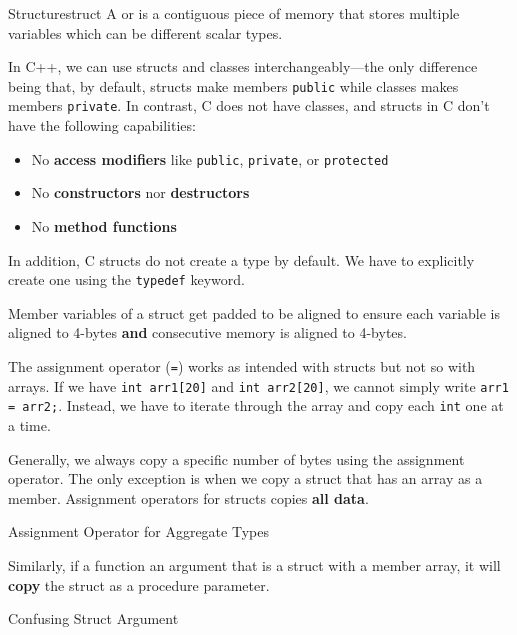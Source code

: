 \documentclass[12pt]{report}
\begin{document}
\begin{dfnbox}{Structure}{struct}
    A  or  is a contiguous piece of memory that stores multiple variables which can be different scalar types.
\end{dfnbox}

In C++, we can use structs and classes interchangeably---the only difference being that, by default, structs make members \texttt{public} while classes makes members \texttt{private}. In contrast, C does not have classes, and structs in C don't have the following capabilities:

\begin{itemize}
    \item No \textbf{access modifiers} like \texttt{public}, \texttt{private}, or \texttt{protected}
    \item No \textbf{constructors} nor \textbf{destructors}
    \item No \textbf{method functions}
\end{itemize}

In addition, C structs do not create a type by default. We have to explicitly create one using the \texttt{typedef} keyword.

Member variables of a struct get padded to be aligned to ensure each variable is aligned to 4-bytes \textbf{and} consecutive memory is aligned to 4-bytes.

The assignment operator (\texttt{=}) works as intended with structs but not so with arrays. If we have \texttt{int arr1[20]} and \texttt{int arr2[20]}, we cannot simply write \texttt{arr1 = arr2;}. Instead, we have to iterate through the array and copy each \texttt{int} one at a time.

Generally, we always copy a specific number of bytes using the assignment operator. The only exception is when we copy a struct that has an array as a member. Assignment operators for structs copies \textbf{all data}.

\begin{codebox}{Assignment Operator for Aggregate Types}{}
\end{codebox}

Similarly, if a function an argument that is a struct with a member array, it will \textbf{copy} the struct as a procedure parameter.

\begin{codebox}{Confusing Struct Argument}{}
\end{codebox}
\end{document}
